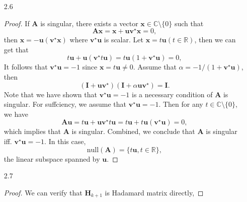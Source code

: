 \begin{enumerate}
    \item[2.6] {
    \begin{proof}
        If $\bm{A}$ is singular, there exists a vector $\bm{x} \in \mathbb{C}\setminus \{0\}$ such that
        $$
         \bm{Ax} = \bm{x} + \bm{u}\bm{v}^{\star} \bm{x} = 0,
        $$
        then $\bm{x} = -\bm{u}(\bm{v}^{\star} \bm{x})$ where $\bm{v}^{\star} \bm{u}$ is scalar. Let $\bm{x} = t\bm{u} (t \in \mathbb{R})$, then we can get that 
        $$
        t\bm{u} + \bm{u} (\bm{v}^{\star} t \bm{u}) = t\bm{u} (1+ \bm{v}^{\star} \bm{u}) = 0,
        $$
        It follows that $\bm{v}^{\star} \bm{u} = -1$ since $\bm{x} = t\bm{u} \neq 0$. Assume that $\alpha = -1/(1 + \bm{v}^{\star} \bm{u})$, then
        $$
        (\bm{I}+\bm{u} \bm{v}^{\star})(\bm{I} + \alpha \bm{u}\bm{v}^{\star}) = \bm{I}.
        $$
        Note that we have shown that $\bm{v}^{\star}\bm{u} = -1$ is a necessary condition of $\bm{A}$ is singular. For suffciency, we assume that $\bm{v}^{\star} \bm{u} = -1$. Then for any $ t \in \mathbb{C} \setminus \{ 0 \}$, we have
        $$
        \bm{Au} = t\bm{u} + \bm{u}\bm{v}^{\star} t \bm{u} = t\bm{u} + t\bm{u} (\bm{v}^{\star} \bm{u}) = 0,
        $$
        which implies that $\bm{A}$ is singular. Combined, we conclude that $\bm{A}$ is singular iff. $\bm{v}^{\star} \bm{u} = -1$. In this case, 
        $$
        \mathrm{null} (\bm{A}) = \{ t\bm{u}, t \in \mathbb{R} \},
        $$
        the linear subspace spanned by $\bm{u}$.
    \end{proof}
    }
    
    \item[2.7] {
    \begin{proof}
    We can verify that $\bm{H}_{k+1}$ is Hadamard matrix directly,
    

\end{proof}}
\end{enumerate}
